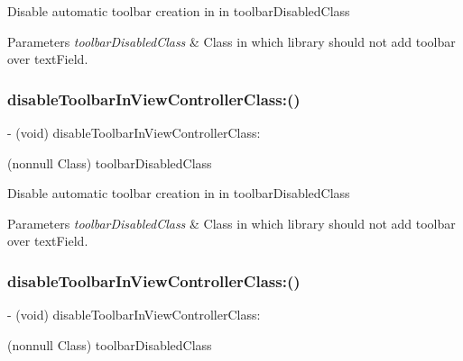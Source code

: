 Disable automatic toolbar creation in in toolbar\+Disabled\+Class


\begin{DoxyParams}{Parameters}
{\em toolbar\+Disabled\+Class} & Class in which library should not add toolbar over text\+Field. \\
\hline
\end{DoxyParams}
\mbox{\label{interface_i_q_keyboard_manager_ab613a813f64570cb4c10e03887356692}} 
\subsubsection{\texorpdfstring{disable\+Toolbar\+In\+View\+Controller\+Class\+:()}{disableToolbarInViewControllerClass:()}\hspace{0.1cm}{\footnotesize\ttfamily [2/3]}}
{\footnotesize\ttfamily -\/ (void) disable\+Toolbar\+In\+View\+Controller\+Class\+: \begin{DoxyParamCaption}\item[{(nonnull Class)}]{toolbar\+Disabled\+Class }\end{DoxyParamCaption}}

Disable automatic toolbar creation in in toolbar\+Disabled\+Class


\begin{DoxyParams}{Parameters}
{\em toolbar\+Disabled\+Class} & Class in which library should not add toolbar over text\+Field. \\
\hline
\end{DoxyParams}
\mbox{\label{interface_i_q_keyboard_manager_ab613a813f64570cb4c10e03887356692}} 
\subsubsection{\texorpdfstring{disable\+Toolbar\+In\+View\+Controller\+Class\+:()}{disableToolbarInViewControllerClass:()}\hspace{0.1cm}{\footnotesize\ttfamily [3/3]}}
{\footnotesize\ttfamily -\/ (void) disable\+Toolbar\+In\+View\+Controller\+Class\+: \begin{DoxyParamCaption}\item[{(nonnull Class)}]{toolbar\+Disabled\+Class }\end{DoxyParamCaption}}

